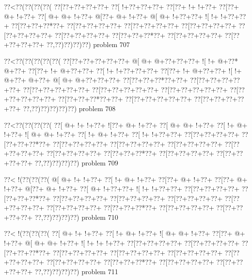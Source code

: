\vbox{\vbox{\goo
\0??<\0??(\0??(\0??(\0??(
\0??[\0??+\0??+\0??+\0??+
\0??[\- !+\0??+\0??+\0??+
\0??[\0??+\- !+\- !+\0??+
\0??[\0??+\- @+\- !+\0??+
\0??[\- @+\- @+\- !+\0??+
\- @[\0??+\- @+\- !+\0??+
\- @[\- @+\- !+\0??+\0??+
\- ![\- !+\- !+\0??+\0??+
\0??[\0??+\0??+\0??*\0??+
\0??[\0??+\0??+\0??+\0??+
\0??[\0??+\0??+\0??+\0??+
\0??[\0??+\0??+\0??+\0??+
\0??[\0??+\0??+\0??+\0??+
\0??[\0??+\0??+\0??+\0??+
\0??[\0??+\0??+\0??*\0??+
\0??[\0??+\0??+\0??+\0??+
\0??[\0??+\0??+\0??+\0??+
\0??,\0??)\0??)\0??)\0??)
}
\hfil problem 707\hfil\break
}

\vbox{\vbox{\goo
\0??<\0??(\0??(\0??(\0??(\0??(
\0??[\0??+\0??+\0??+\0??+\0??+
\- @[\- @+\- @+\0??+\0??+\0??+
\- ![\- !+\- @+\0??*\- @+\0??+
\0??[\0??+\- !+\- @+\0??+\0??+
\0??[\- !+\- !+\0??+\0??+\0??+
\0??[\0??+\- !+\- @+\0??+\0??+
\- ![\- !+\- @+\0??+\- @+\0??+
\- @[\- @+\- @+\0??+\0??+\0??+
\0??[\0??+\0??+\0??*\0??+\0??+
\0??[\0??+\0??+\0??+\0??+\0??+
\0??[\0??+\0??+\0??+\0??+\0??+
\0??[\0??+\0??+\0??+\0??+\0??+
\0??[\0??+\0??+\0??+\0??+\0??+
\0??[\0??+\0??+\0??+\0??+\0??+
\0??[\0??+\0??+\0??*\0??+\0??+
\0??[\0??+\0??+\0??+\0??+\0??+
\0??[\0??+\0??+\0??+\0??+\0??+
\0??,\0??)\0??)\0??)\0??)\0??)
}
\hfil problem 708\hfil\break
}

\vbox{\vbox{\goo
\0??<\0??(\0??(\0??(\0??(
\0??[\- @+\- !+\- !+\0??+
\- ![\0??+\- @+\- !+\0??+
\0??[\- @+\- @+\- !+\0??+
\0??[\- !+\- @+\- !+\0??+
\- ![\- @+\- @+\- !+\0??+
\0??[\- !+\- @+\- !+\0??+
\0??[\- !+\- !+\0??+\0??+
\0??[\0??+\0??+\0??+\0??+
\0??[\0??+\0??+\0??*\0??+
\0??[\0??+\0??+\0??+\0??+
\0??[\0??+\0??+\0??+\0??+
\0??[\0??+\0??+\0??+\0??+
\0??[\0??+\0??+\0??+\0??+
\0??[\0??+\0??+\0??+\0??+
\0??[\0??+\0??+\0??*\0??+
\0??[\0??+\0??+\0??+\0??+
\0??[\0??+\0??+\0??+\0??+
\0??,\0??)\0??)\0??)\0??)
}
\hfil problem 709\hfil\break
}

\vbox{\vbox{\goo
\0??<\- !(\0??(\0??(\0??(
\- @[\- @+\- !+\- !+\0??+
\0??[\- !+\- @+\- !+\0??+
\0??[\0??+\- @+\- !+\0??+
\0??[\0??+\- @+\- !+\0??+
\- @[\0??+\- @+\- !+\0??+
\0??[\- @+\- !+\0??+\0??+
\- ![\- !+\- !+\0??+\0??+
\0??[\0??+\0??+\0??+\0??+
\0??[\0??+\0??+\0??*\0??+
\0??[\0??+\0??+\0??+\0??+
\0??[\0??+\0??+\0??+\0??+
\0??[\0??+\0??+\0??+\0??+
\0??[\0??+\0??+\0??+\0??+
\0??[\0??+\0??+\0??+\0??+
\0??[\0??+\0??+\0??*\0??+
\0??[\0??+\0??+\0??+\0??+
\0??[\0??+\0??+\0??+\0??+
\0??,\0??)\0??)\0??)\0??)
}
\hfil problem 710\hfil\break
}

\vbox{\vbox{\goo
\0??<\- !(\0??(\0??(\0??(
\0??[\- @+\- !+\- !+\0??+
\0??[\- !+\- @+\- !+\0??+
\- ![\- @+\- @+\- !+\0??+
\0??[\0??+\- @+\- !+\0??+
\- @[\- @+\- @+\- !+\0??+
\- ![\- !+\- !+\- !+\0??+
\0??[\0??+\0??+\0??+\0??+
\0??[\0??+\0??+\0??+\0??+
\0??[\0??+\0??+\0??*\0??+
\0??[\0??+\0??+\0??+\0??+
\0??[\0??+\0??+\0??+\0??+
\0??[\0??+\0??+\0??+\0??+
\0??[\0??+\0??+\0??+\0??+
\0??[\0??+\0??+\0??+\0??+
\0??[\0??+\0??+\0??*\0??+
\0??[\0??+\0??+\0??+\0??+
\0??[\0??+\0??+\0??+\0??+
\0??,\0??)\0??)\0??)\0??)
}
\hfil problem 711\hfil\break
}

